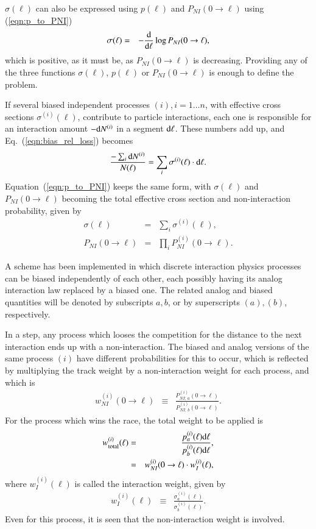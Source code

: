 $\sigma(\ell)$ can also be expressed using $p(\ell)$ and $P_{NI}(0\to\ell)$ 
using
(\ref{eqn:p_to_PNI})
\begin{eqnarray}
\label{eqn:sigma_to_PNI}
 \sigma(\ell) &=& -\frac{{\rm d}}{{\rm d}\ell}\log P_{NI}(0\to\ell),
\end{eqnarray}
which is positive, as it must be, as $P_{NI}(0\to\ell)$ is decreasing.
Providing any of the three functions $\sigma(\ell)$, $p(\ell)$ or $P_{NI}(0\to\ell)$
is enough to define the problem.

If several biased independent processes $(i), i=1\dots n$, with effective
cross sections  $\sigma^{(i)}(\ell)$, contribute to particle interactions, each
one is responsible for an interaction amount $-{\rm d}N^{(i)}$ in a segment 
${\rm d}\ell$.  These numbers add up, and Eq.~(\ref{eqn:bias_rel_loss}) 
becomes
\begin{equation}
\label{eqn:bias_rel_loss_many}
\frac{-\sum_i{\rm d}N^{(i)}}{N(\ell)}=\sum_i\sigma^{(i)}(\ell)\cdot {{\rm d}\ell}.
\end{equation}
Equation~(\ref{eqn:p_to_PNI})
keeps the same form, with $\sigma(\ell)$ and
$P_{NI}(0\to\ell)$ becoming the total effective cross section and 
non-interaction probability, given by
\begin{eqnarray}
\sigma(\ell) &=& \sum_i\sigma^{(i)}(\ell), \\
P_{NI}(0\to\ell) &=& \prod_i P^{(i)}_{NI}(0\to\ell).
\end{eqnarray}

A scheme has been implemented in which discrete interaction physics processes
can be biased independently of each other, each possibly having its analog 
interaction law replaced by a biased one. The related analog and biased 
quantities will be denoted by subscripts $a, b$, or by superscripts $(a), (b)$, 
respectively.

In a step, any process which looses the competition for the distance to the next
interaction ends up with a non-interaction.  The biased and analog versions of 
the same process $(i)$ have different probabilities for this to occur, which is
reflected by multiplying the track weight by a non-interaction weight for
each process, and which is
\begin{eqnarray}
\label{eqn:non_int_weight}
w_{NI}^{(i)}(0\to\ell) &\equiv& \frac{P^{(i)}_{NI;\,a}(0\to\ell)}{P^{(i)}_{NI;\,b}(0\to\ell)} .
\end{eqnarray}
For the process which wins the race, the total weight to be applied is
\begin{eqnarray}
w_{\rm total}^{(i)}(\ell) &=& \frac
{p^{(i)}_a(\ell){\rm d}\ell}
{p^{(i)}_b(\ell){\rm d}\ell} , \nonumber \\
&=& w_{NI}^{(i)}(0\to\ell)\cdot w_{I}^{(i)}(\ell) ,
\end{eqnarray}
where $w_{I}^{(i)}(\ell)$ is called the interaction weight, given by
\begin{eqnarray}
\label{eqn:int_weight}
w_{I}^{(i)}(\ell) &\equiv& \frac
{\sigma^{(i)}_a(\ell)}
{\sigma^{(i)}_b(\ell)} .
\end{eqnarray}
Even for this process, it is seen that the non-interaction weight is involved.

